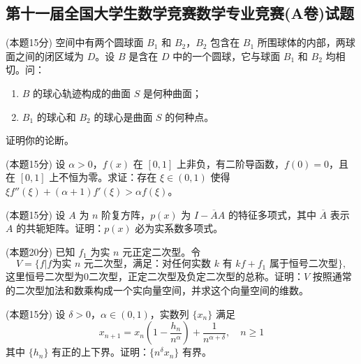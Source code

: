 \documentclass[loose]{ExBook}
\begin{document}
\subsection{第十一届全国大学生数学竞赛数学专业竞赛(A卷)试题}
\begin{qitems}
    \begin{bbox}
        \qitem (本题15分) 空间中有两个圆球面 \( B_1 \) 和 \( B_2 \)，\( B_2 \) 包含在 \( B_1 \) 所围球体的内部，两球面之间的闭区域为 \( D \)。设 \( B \) 是含在 \( D \) 中的一个圆球，它与球面 \( B_1 \) 和 \( B_2 \) 均相切。问：
        
        \begin{enumerate}[label=(\roman*)]
            \item \( B \) 的球心轨迹构成的曲面 \( S \) 是何种曲面；
            \item \( B_1 \) 的球心和 \( B_2 \) 的球心是曲面 \( S \) 的何种点。
        \end{enumerate}
        证明你的论断。
    \end{bbox}

    \begin{bbox}
        \qitem (本题15分) 设 \( \alpha > 0 \)，\( f(x) \) 在 \([0,1]\) 上非负，有二阶导函数，\( f(0) = 0 \)，且在 \([0,1]\) 上不恒为零。求证：存在 \(\xi \in (0,1)\) 使得 \(\xi f''(\xi) + (\alpha + 1)f'(\xi) > \alpha f(\xi)\)。
    \end{bbox}

    \begin{bbox}
        \qitem (本题15分) 设 \( A \) 为 \( n \) 阶复方阵，\( p(x) \) 为 \( I - \overline{A}A \) 的特征多项式，其中 \( \overline{A} \) 表示 \( A \) 的共轭矩阵。证明：\( p(x) \) 必为实系数多项式。
    \end{bbox}

    \begin{bbox}
        \qitem (本题20分) 已知 \( f_1 \) 为实 \( n \) 元正定二次型。令
        \[
        V = \{ f | f \text{为实 } n \text{ 元二次型，满足：对任何实数 } k \text{ 有 } kf + f_1 \text{ 属于恒号二次型} \},
        \]
        这里恒号二次型为0二次型，正定二次型及负定二次型的总称。证明：\( V \) 按照通常的二次型加法和数乘构成一个实向量空间，并求这个向量空间的维数。
    \end{bbox}

    \begin{bbox}
        \qitem (本题15分) 设 \( \delta > 0 \)，\( \alpha \in (0,1) \)，实数列 \(\{ x_n \}\) 满足
        \[
        x_{n+1} = x_n \left( 1 - \frac{h_n}{n^\alpha} \right) + \frac{1}{n^{\alpha + \delta}}, \quad n \geq 1
        \]
        其中 \(\{ h_n \}\) 有正的上下界。证明：\(\{ n^\delta x_n \}\) 有界。
    \end{bbox}


\end{qitems}
\end{document}
